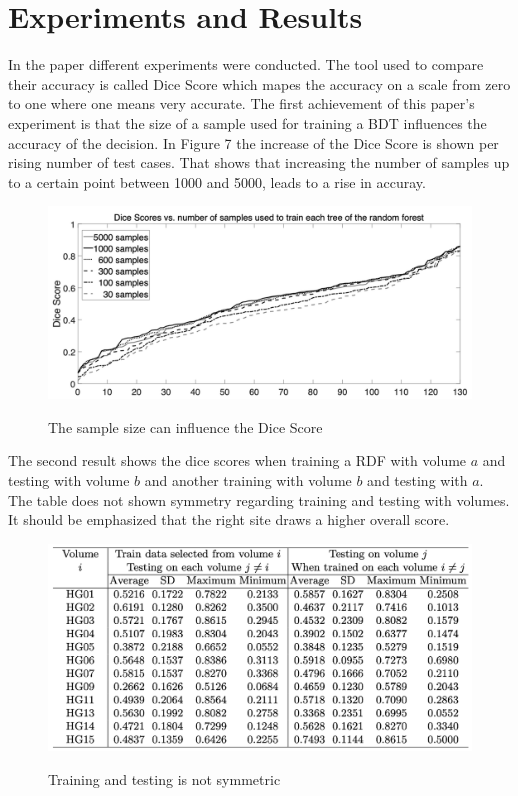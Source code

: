 \documentclass[
12pt,
headsepline,
bibliography=totoc,
twoside=semi,
]{scrartcl}
\begin{document}
\section{Experiments and Results\label{sec:sec4}}

 In the paper different experiments were conducted. The tool used to compare their accuracy is called Dice Score which mapes the accuracy on a scale from zero to one where one means very accurate. 
 The first achievement of this paper's experiment is that the size of a sample used for training a BDT influences the accuracy of the decision. In Figure 7 the increase of the Dice Score is shown per rising number of test cases. That shows that increasing the number of samples up to a certain point between 1000 and 5000, leads to a rise in accuray.
 
 \begin{figure}[H]
 \centering \includegraphics[scale=0.5]{BDT16.png}\label{fig:test}
 \caption{The sample size can influence the Dice Score}
 \end{figure} 

 The second result shows the dice scores when training a RDF with volume $a$ and testing with volume $b$ and another training with volume $b$ and testing with $a$. The table does not shown symmetry regarding training and testing with volumes. It should be emphasized that the right site draws a higher overall score. 

 \begin{figure}[H]
 \centering \includegraphics[scale=0.55]{BDT17.png}\label{fig:fig17}
 \caption{Training and testing is not symmetric}
 \end{figure} 
\end{document}
